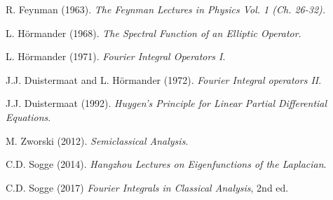 \documentclass{article}
\theoremstyle{plain}
\theoremstyle{remark}
\theoremstyle{definition}
\begin{document}
\begin{comment}
Stone's Theorem tells us that we should only expect a well-defined theory of operators of the form $e^{itP}$ if the operator $P$ is a self-adjoint operator. Conveniently, this condition also implies that the principal symbol $p$ is real-valued, which implies that the zeroes of the symbol of the operator $L$ in the variable $\tau$ are purely imaginary, so we can apply the theory of hyperbolic equations to such operators. In order to have a non-singular theory of characteristics for the hyperbolic equation, it is necessary to assume that $p$ is a non-vanishing symbol, i.e., that $P$ is an elliptic pseudodifferential operator. So these are our assumptions, we study an equation of the form $L$, where $P$ is a self-adjoint, elliptic pseudodifferential operator of order one. Here are some important examples to keep in mind:
%
\begin{itemize}
	\item If $M$ is a Riemannian manifold, then we can define the Laplace-Beltrami operator
	\[ \Delta_g f = |g|^{-1/2} \sum_i \partial_i ( |g|^{1/2} g^{ij} \partial_ j f ). \]
	The operator $\sqrt{-\Delta_g}$ is a self-adjoint, elliptic pseudodifferential operator of order one with principal symbol $|\xi|_g$.

	\item s 
\end{itemize}

\end{comment}

\begin{thebibliography}{9}

 R. Feynman (1963). \emph{The Feynman Lectures in Physics Vol. 1 (Ch. 26-32).}

 L. H\"{o}rmander (1968). \emph{The Spectral Function of an Elliptic Operator}.

 L. H\"{o}rmander (1971). \emph{Fourier Integral Operators I}.

 J.J. Duistermaat and L. H\"{o}rmander (1972). \emph{Fourier Integral operators II}.

 J.J. Duistermaat (1992). \emph{Huygen's Principle for Linear Partial Differential Equations}.

 M. Zworski (2012). \emph{Semiclassical Analysis}.

 C.D. Sogge (2014). \emph{Hangzhou Lectures on Eigenfunctions of the Laplacian}.

 C.D. Sogge (2017) \emph{Fourier Integrals in Classical Analysis}, 2nd ed.

\end{thebibliography}
\end{document}
